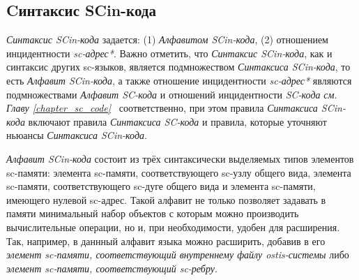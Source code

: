 \begin{SCn}
\begin{scnindent}
\end{scnindent}
\end{SCn}

\subsection{Cинтаксис SCin-кода}
\label{sec_soft_platform_scin_code_alphabet_and_syntax}

\textit{Синтаксис SCin-кода} задается: (1) \textit{Алфавитом SCin-кода}, (2) отношением инцидентности \textit{sc-адрес*}. Важно отметить, что \textit{Синтаксис SCin-кода}, как и синтаксис других sc-языков, является подмножеством \textit{Синтаксиса SCin-кода}, то есть \textit{Алфавит SCin-кода\scnsupergroupsign}, а также отношение инцидентности \textit{sc-адрес*} являются подмножествами \textit{Алфавит SC-кода\scnsupergroupsign} и отношений инцидентности \textit{SC-кода} \textit{см. Главу \ref{chapter_sc_code}~} соответственно, при этом правила \textit{Синтаксиса SCin-кода} включают правила \textit{Синтаксиса SC-кода} и правила, которые уточняют ньюансы \textit{Синтаксиса SCin-кода}.

\begin{SCn}
\begin{scneqtoset}
    \begin{scnindent}
    \end{scnindent}
\end{scneqtoset}
\end{SCn}

\textit{Алфавит SCin-кода\scnsupergroupsign} состоит из трёх синтаксически выделяемых типов элементов sc-памяти: элемента sc-памяти, соответствующего sc-узлу общего вида, элемента sc-памяти, соответствующего sc-дуге общего вида и элемента sc-памяти, имеющего нулевой sc-адрес. Такой алфавит не только позволяет задавать в памяти минимальный набор объектов с которым можно производить вычислительные операции, но и, при необходимости, удобен для расширения. Так, например, в даннный алфавит языка можно расширить, добавив в его \textit{элемент sc-памяти, соответствующий внутреннему файлу ostis-системы} либо \textit{элемент sc-памяти, соответствующий sc-ребру}.

